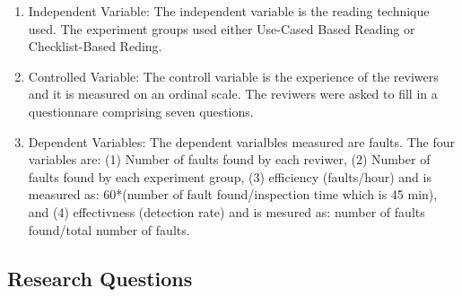 \documentclass[10pt,twocolumn]{article}
\begin{document}
\begin{enumerate}[label=(\alph*)]

\item Independent Variable: The independent variable is
the reading technique used. The experiment groups used either
Use-Cased Based Reading or Checklist-Based Reding.
\item Controlled Variable: The controll variable is the
experience of the reviwers and it is measured on an ordinal
scale. The reviwers were asked to fill in a questionnare
comprising seven questions.
\item Dependent Variables: The dependent varialbles
measured are faults. The four variables are: (1) Number of
faults found by each reviwer, (2) Number of faults found by
each experiment group, (3) efficiency (faults/hour) and is
measured as: 60*(number of fault found/inspection time which
is 45 min), and (4) effectivness (detection rate) and is mesured
as: number of faults found/total number of faults.

\end{enumerate}

\subsection{Research Questions}
\end{document}
